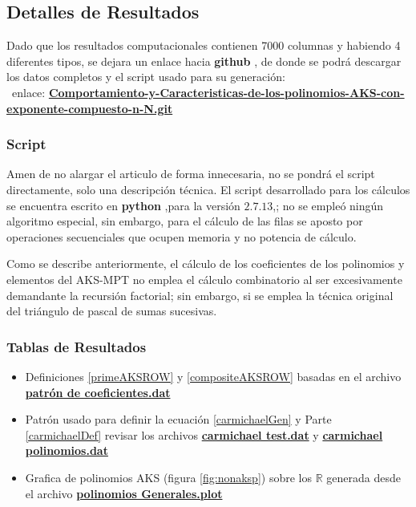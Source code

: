 \documentclass[a4paper, 12pt]{article}
\begin{document}
\subsection{Detalles de Resultados}
Dado que los resultados computacionales contienen 7000 columnas y habiendo 4 diferentes tipos, se dejara un enlace hacia \textbf{github} , de donde se podrá descargar los datos completos y el script usado para su generación:
\ \\
\
enlace:
\href{https://github.com/coituselpingo/Comportamiento-y-Caracteristicas-de-los-polinomios-AKS-con-exponente-compuesto-n-N.git}{\textbf{Comportamiento-y-Caracteristicas-de-los-polinomios-AKS-con-exponente-compuesto-n-N.git}} 

\subsubsection{Script}
Amen de no alargar el articulo de forma innecesaria, no se pondrá el script directamente, solo una descripción técnica.
El script desarrollado para los cálculos se encuentra escrito en \textbf{python} ,para la versión $2.7.13$,; no se empleó ningún algoritmo especial, sin embargo, para el cálculo de las filas se aposto por operaciones secuenciales que ocupen memoria y no potencia de cálculo.

Como se describe anteriormente, el cálculo de los coeficientes de los polinomios y elementos del AKS-MPT no emplea el cálculo combinatorio al ser excesivamente demandante la recursión factorial; sin embargo, si se emplea la técnica original del triángulo de pascal de sumas sucesivas.
\subsubsection{Tablas de Resultados}
\begin{itemize}
	\item Definiciones \ref{primeAKSROW} y \ref{compositeAKSROW} basadas en el archivo
		\href{https://github.com/coituselpingo/Comportamiento-y-Caracteristicas-de-los-polinomios-AKS-con-exponente-compuesto-n-N/blob/master/patron de coeficientes.dat}{\textbf{patrón de coeficientes.dat}}
	\item Patrón usado para definir la ecuación \ref{carmichaelGen} y Parte \ref{carmichaelDef} revisar los archivos
		\href{https://github.com/coituselpingo/Comportamiento-y-Caracteristicas-de-los-polinomios-AKS-con-exponente-compuesto-n-N/blob/master/carmichael_test.dat}{\textbf{carmichael test.dat}} y \href{https://github.com/coituselpingo/Comportamiento-y-Caracteristicas-de-los-polinomios-AKS-con-exponente-compuesto-n-N/blob/master/carmichael_polinomios.dat}{\textbf{carmichael polinomios.dat}}
	\item Grafica de polinomios AKS (figura \ref{fig:nonaksp}) sobre los $\mathbb{R}$ generada desde el archivo \href{https://github.com/coituselpingo/Comportamiento-y-Caracteristicas-de-los-polinomios-AKS-con-exponente-compuesto-n-N/blob/master/polinomios Generales.plot}{\textbf{polinomios Generales.plot}}
\end{itemize}
 
\end{document}
